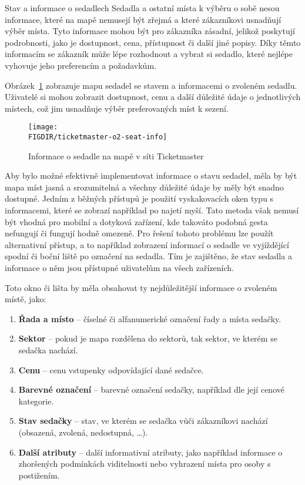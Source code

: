 \begin{subsection}{Stav a informace o sedadlech}
    \label{subsec:identifikace-interaktivni-mapa-stav-a-informace-o-sedadlech}
    Sedadla a ostatní místa k výběru o sobě nesou informace, které na mapě nemusejí být zřejmá a které zákazníkovi usnadňují výběr místa.
    Tyto informace mohou být pro zákazníka zásadní, jelikož poskytují podrobnosti, jako je dostupnost, cena, přístupnost či další jiné popisy.
    Díky těmto informacím se zákazník může lépe rozhodnout a vybrat si sedadlo, které nejlépe vyhovuje jeho preferencím a požadavkům.

    Obrázek~\ref{fig:ticketmaster-o2-seat-info} zobrazuje mapu sedadel se stavem a informacemi o zvoleném sedadlu.
    Uživatelé si mohou zobrazit dostupnost, cenu a další důležité údaje o jednotlivých místech, což jim usnadňuje výběr preferovaných míst k sezení.

    \begin{figure}[H]
        \centering
        \caption{Informace o sedadle na mapě v síti Ticketmaster}
        \texttt{[image: \\FIGDIR/ticketmaster-o2-seat-info]}
        \label{fig:ticketmaster-o2-seat-info}
    \end{figure}

    Aby bylo možné efektivně implementovat informace o stavu sedadel, měla by být mapa míst jasná a srozumitelná a všechny důležité údaje by měly být snadno dostupné.
    Jedním z běžných přístupů je použití vyskakovacích oken typu  s informacemi, které se zobrazí například po najetí myší.
    Tato metoda však nemusí být vhodná pro mobilní a dotyková zařízení, kde takováto podobná gesta nefungují či fungují hodně omezeně.
    Pro řešení tohoto problému lze použít alternativní přístup, a to například zobrazení informací o sedadle ve vyjíždějící spodní či boční liště po označení na sedadla.
    Tím je zajištěno, že stav sedadla a informace o něm jsou přístupné uživatelům na všech zařízeních.

    Toto okno či lišta by měla obsahovat ty nejdůležitější informace o zvoleném místě, jako:
    \begin{enumerate}
        \item \textbf{Řada a místo} – číselné či alfanumerické označení řady a místa sedačky.
        \item \textbf{Sektor} – pokud je mapa rozdělena do sektorů, tak sektor, ve kterém se sedačka nachází.
        \item \textbf{Cenu} – cenu vstupenky odpovídající dané sedačce.
        \item \textbf{Barevné označení} – barevné označení sedačky, například dle její cenové kategorie.
        \item \textbf{Stav sedačky} – stav, ve kterém se sedačka vůči zákazníkovi nachází (obsazená, zvolená, nedostupná, \ldots).
        \item \textbf{Další atributy} – další informativní atributy, jako například informace o zhoršených podmínkách viditelnosti nebo vyhrazení místa pro osoby s postižením.
    \end{enumerate}
\end{subsection}

